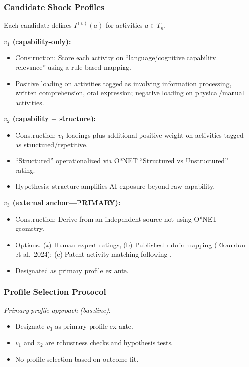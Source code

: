 \documentclass[12pt]{article}
\begin{document}
\subsubsection{Candidate Shock Profiles}


Each candidate defines $I^{(v)}(a)$ for activities $a \in T_n$.

\medskip
\noindent\textbf{$v_1$ (capability-only):}
\begin{itemize}
    \item Construction: Score each activity on ``language/cognitive capability relevance'' using a rule-based mapping.
    \item Positive loading on activities tagged as involving information processing, written comprehension, oral expression; negative loading on physical/manual activities.
\end{itemize}

\noindent\textbf{$v_2$ (capability $+$ structure):}
\begin{itemize}
    \item Construction: $v_1$ loadings plus additional positive weight on activities tagged as structured/repetitive.
    \item ``Structured'' operationalized via O*NET ``Structured vs Unstructured'' rating.
    \item Hypothesis: structure amplifies AI exposure beyond raw capability.
\end{itemize}

\noindent\textbf{$v_3$ (external anchor---PRIMARY):}
\begin{itemize}
    \item Construction: Derive from an independent source not using O*NET geometry.
    \item Options: (a) Human expert ratings; (b) Published rubric mapping (Eloundou et al.\ 2024); (c) Patent-activity matching following \citet{Webb2020}.
    \item Designated as primary profile ex ante.
\end{itemize}


\subsubsection{Profile Selection Protocol}


\noindent\textit{Primary-profile approach (baseline):}
\begin{itemize}
    \item Designate $v_3$ as primary profile ex ante.
    \item $v_1$ and $v_2$ are robustness checks and hypothesis tests.
    \item No profile selection based on outcome fit.
\end{itemize}
\end{document}
